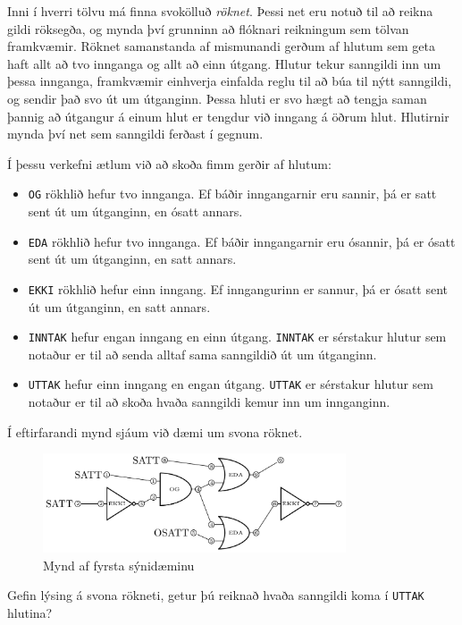 
Inni í hverri tölvu má finna svokölluð \emph{röknet}. Þessi net eru notuð til
að reikna gildi röksegða, og mynda því grunninn að flóknari reikningum sem
tölvan framkvæmir. Röknet samanstanda af mismunandi gerðum af hlutum sem geta
haft allt að tvo innganga og allt að einn útgang. Hlutur tekur sanngildi inn
um þessa innganga, framkvæmir einhverja einfalda reglu til að búa til nýtt
sanngildi, og sendir það svo út um útganginn. Þessa hluti er svo hægt að tengja
saman þannig að útgangur á einum hlut er tengdur við inngang á öðrum hlut.
Hlutirnir mynda því net sem sanngildi ferðast í gegnum.

Í þessu verkefni ætlum við að skoða fimm gerðir af hlutum:
\begin{itemize}
\item \texttt{OG} rökhlið hefur tvo innganga. Ef báðir inngangarnir eru sannir, þá er satt sent út um útganginn, en ósatt annars.
\item \texttt{EDA} rökhlið hefur tvo innganga. Ef báðir inngangarnir eru ósannir, þá er ósatt sent út um útganginn, en satt annars.
\item \texttt{EKKI} rökhlið hefur einn inngang. Ef inngangurinn er sannur, þá er ósatt sent út um útganginn, en satt annars.
\item \texttt{INNTAK} hefur engan inngang en einn útgang. \texttt{INNTAK} er sérstakur hlutur sem notaður er til að senda alltaf sama sanngildið út um útganginn.
\item \texttt{UTTAK} hefur einn inngang en engan útgang. \texttt{UTTAK} er sérstakur hlutur sem notaður er til að skoða hvaða sanngildi kemur inn um innganginn.
\end{itemize}

Í eftirfarandi mynd sjáum við dæmi um svona röknet.

\begin{figure}[h]
    \centering
    \includegraphics[width=0.8\textwidth]{network.png}
    \caption{Mynd af fyrsta sýnidæminu}
\end{figure}

Gefin lýsing á svona rökneti, getur þú reiknað hvaða sanngildi koma í \texttt{UTTAK} hlutina?

